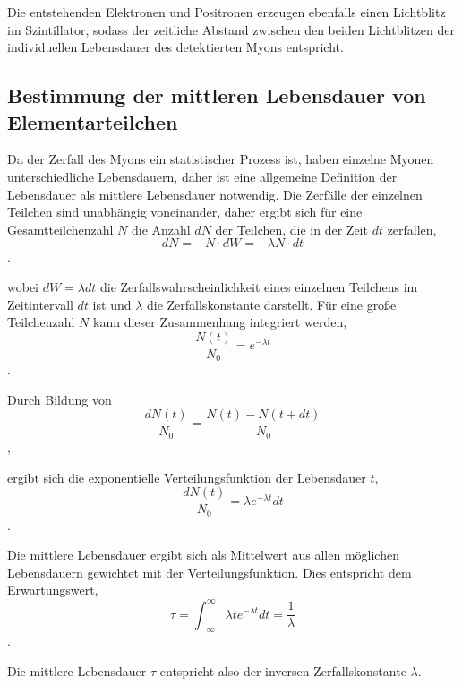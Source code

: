 Die entstehenden Elektronen und Positronen erzeugen ebenfalls einen Lichtblitz im Szintillator, sodass der zeitliche Abstand zwischen den beiden Lichtblitzen der individuellen Lebensdauer des detektierten Myons entspricht.

\subsection{Bestimmung der mittleren Lebensdauer von Elementarteilchen}

Da der Zerfall des Myons ein statistischer Prozess ist, haben einzelne Myonen unterschiedliche Lebensdauern, daher ist eine allgemeine Definition der Lebensdauer als mittlere Lebensdauer notwendig. Die Zerfälle der einzelnen Teilchen sind unabhängig voneinander, daher ergibt sich für eine Gesamtteilchenzahl $N$ die Anzahl $dN$ der Teilchen, die in der Zeit $dt$ zerfallen, $$dN = -N \cdot dW = -\lambda N \cdot dt$$.

wobei $dW = \lambda dt$ die Zerfallswahrscheinlichkeit eines einzelnen Teilchens im Zeitintervall $dt$ ist und $\lambda$ die Zerfallskonstante darstellt. Für eine große Teilchenzahl $N$ kann dieser Zusammenhang integriert werden, $$\frac{N(t)}{N_0} = e^{-\lambda t}$$.

Durch Bildung von $$\frac{dN(t)}{N_0} = \frac{N(t) - N(t+dt)}{N_0}$$,

ergibt sich die exponentielle Verteilungsfunktion der Lebensdauer $t$, $$\frac{dN(t)}{N_0} = \lambda e^{-\lambda t} dt$$.

Die mittlere Lebensdauer ergibt sich als Mittelwert aus allen möglichen Lebensdauern gewichtet mit der Verteilungsfunktion. Dies entspricht dem Erwartungswert, $$\tau = \int_{-\infty}^{\infty} \lambda t e^{-\lambda t} dt = \frac{1}{\lambda}$$.

Die mittlere Lebensdauer $\tau$ entspricht also der inversen Zerfallskonstante $\lambda$.
